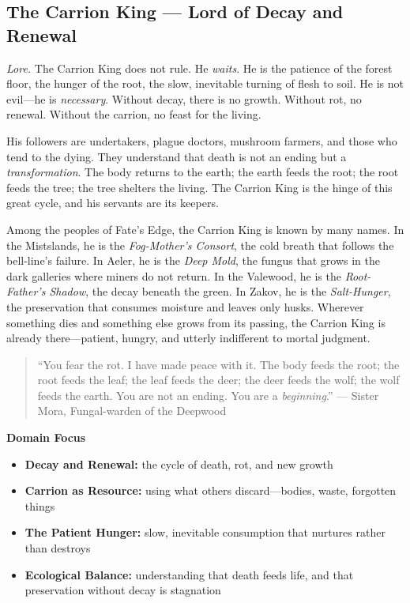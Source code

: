 \subsection{The Carrion King --- Lord of Decay and Renewal}

\textit{Lore.} The Carrion King does not rule. He \textit{waits}. He is the patience of the forest floor, the hunger of the root, the slow, inevitable turning of flesh to soil. He is not evil---he is \textit{necessary}. Without decay, there is no growth. Without rot, no renewal. Without the carrion, no feast for the living.

His followers are undertakers, plague doctors, mushroom farmers, and those who tend to the dying. They understand that death is not an ending but a \textit{transformation}. The body returns to the earth; the earth feeds the root; the root feeds the tree; the tree shelters the living. The Carrion King is the hinge of this great cycle, and his servants are its keepers.

Among the peoples of Fate's Edge, the Carrion King is known by many names. In the Mistslands, he is the \textit{Fog-Mother's Consort}, the cold breath that follows the bell-line's failure. In Aeler, he is the \textit{Deep Mold}, the fungus that grows in the dark galleries where miners do not return. In the Valewood, he is the \textit{Root-Father's Shadow}, the decay beneath the green. In Zakov, he is the \textit{Salt-Hunger}, the preservation that consumes moisture and leaves only husks. Wherever something dies and something else grows from its passing, the Carrion King is already there---patient, hungry, and utterly indifferent to mortal judgment.

\begin{quote}
``You fear the rot. I have made peace with it. The body feeds the root; the root feeds the leaf; the leaf feeds the deer; the deer feeds the wolf; the wolf feeds the earth. You are not an ending. You are a \textit{beginning}.'' 
\vspace{0.2cm}
--- Sister Mora, Fungal-warden of the Deepwood
\end{quote}

\noindent\textbf{Domain Focus}
\begin{itemize}
  \item \textbf{Decay and Renewal:} the cycle of death, rot, and new growth
  \item \textbf{Carrion as Resource:} using what others discard---bodies, waste, forgotten things
  \item \textbf{The Patient Hunger:} slow, inevitable consumption that nurtures rather than destroys
  \item \textbf{Ecological Balance:} understanding that death feeds life, and that preservation without decay is stagnation
\end{itemize}

